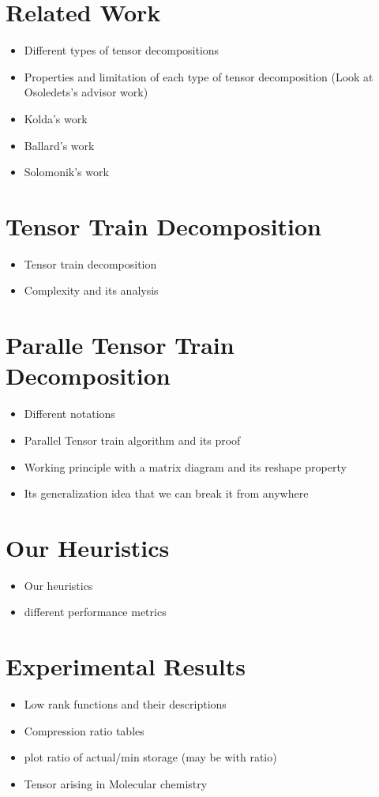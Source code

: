 \documentclass[runningheads]{llncs}
\begin{document}
\section{Related Work}
\label{sec:relatedWork}
\begin{itemize}
	\item Different types of tensor decompositions
	\item Properties  and limitation of each type of tensor decomposition (Look at Osoledets's advisor work)
	\item Kolda's work
	\item Ballard's work
	\item Solomonik's work
\end{itemize}


\section{Tensor Train Decomposition}
\label{sec:tt}
\begin{itemize}
	\item Tensor train decomposition
	\item Complexity and its analysis
\end{itemize}

\section{Paralle Tensor Train Decomposition}
\label{sec:ptt}
\begin{itemize}
	\item Different notations
	\item Parallel Tensor train algorithm and its proof
	\item Working principle with a matrix diagram and its reshape property
	\item Its generalization idea that we can break it from anywhere
\end{itemize}
\section{Our Heuristics}
\label{sec:heuristics}
\begin{itemize}
	\item Our heuristics
	\item different performance metrics
\end{itemize}
\section{Experimental Results}
\label{sec:expResults}
\begin{itemize}
	\item Low rank functions and their descriptions
	\item Compression ratio tables
	\item plot ratio of actual/min storage (may be with ratio)
	\item Tensor arising in Molecular chemistry
\end{itemize}
\end{document}

